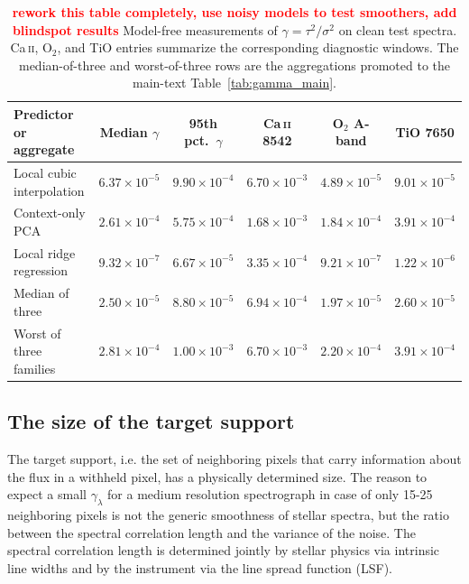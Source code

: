 \documentclass[twocolumn]{aastex7}
\newcommand{\ld}[1]{\textcolor{red}{\textbf{#1}}}
\begin{document}
\begin{table}
\centering
\begin{tabular}{lccccc}
\hline
Predictor or aggregate & Median $\gamma$ & 95th pct.\ $\gamma$ & Ca\,\textsc{ii} 8542 & O$_2$ A-band & TiO 7650 \\
\hline
Local cubic interpolation & $6.37\times10^{-5}$ & $9.90\times10^{-4}$ & $6.70\times10^{-3}$ & $4.89\times10^{-5}$ & $9.01\times10^{-5}$ \\
Context-only PCA & $2.61\times10^{-4}$ & $5.75\times10^{-4}$ & $1.68\times10^{-3}$ & $1.84\times10^{-4}$ & $3.91\times10^{-4}$ \\
Local ridge regression & $9.32\times10^{-7}$ & $6.67\times10^{-5}$ & $3.35\times10^{-4}$ & $9.21\times10^{-7}$ & $1.22\times10^{-6}$ \\
Median of three & $2.50\times10^{-5}$ & $8.80\times10^{-5}$ & $6.94\times10^{-4}$ & $1.97\times10^{-5}$ & $2.60\times10^{-5}$ \\
Worst of three families & $2.81\times10^{-4}$ & $1.00\times10^{-3}$ & $6.70\times10^{-3}$ & $2.20\times10^{-4}$ & $3.91\times10^{-4}$ \\
\hline
\end{tabular}
\label{tab:gamma_full}
\caption{\ld{rework this table completely, use noisy models to test smoothers, add blindspot results} Model-free measurements of $\gamma=\tau^{2}/\sigma^{2}$ on clean test spectra. Ca\,\textsc{ii}, O$_2$, and TiO entries summarize the corresponding diagnostic windows. The median-of-three and worst-of-three rows are the aggregations promoted to the main-text Table~\ref{tab:gamma_main}.}
\end{table}

\subsection{The size of the target support}

The target support, i.e. the set of neighboring pixels that carry information about the flux in a withheld pixel, has a physically determined size. The reason to expect a small $\gamma_\lambda$ for a medium resolution spectrograph in case of only 15-25 neighboring pixels is not the generic smoothness of stellar spectra, but the ratio between the spectral correlation length and the variance of the noise. The spectral correlation length is determined jointly by stellar physics via intrinsic line widths and by the instrument via the line spread function (LSF).
\end{document}

